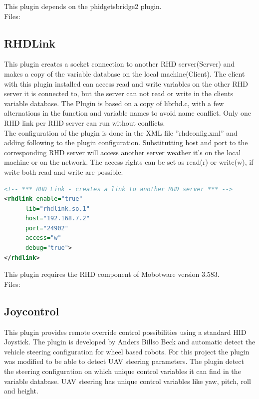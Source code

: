 \noindent
This plugin depends on the phidgetsbridge2 plugin.\\

\noindent
Files:

\subsection{RHDLink}
This plugin creates a socket connection to another RHD server(Server) and makes a copy of the variable database on the local machine(Client). The client with this plugin installed can access read and write variables on the other RHD server it is connected to, but the server can not read or write in the clients variable database. 
The Plugin is based on a copy of librhd.c, with a few alternations in the function and variable names to avoid name conflict. Only one RHD link per RHD server can run without conflicts. \\

\noindent
The configuration of the plugin is done in the XML file ''rhdconfig.xml'' and adding following to the plugin configuration. Substitutting host and port to the corresponding RHD server will access another server weather it's on the local machine or on the network.
The access rights can be set as read(r) or write(w), if write both read and write are possible.
\begin{lstlisting}[language=XML]
<!-- *** RHD Link - creates a link to another RHD server *** -->
<rhdlink enable="true"
	  lib="rhdlink.so.1"
      host="192.168.7.2"
      port="24902"
      access="w"
      debug="true">
</rhdlink>
\end{lstlisting}

\noindent
This plugin requires the RHD component of Mobotware version 3.583.\\

\noindent
Files:


\subsection{Joycontrol}
This plugin provides remote override control possibilities using a standard HID Joystick. The plugin is developed by Anders Billso Beck and automatic detect the vehicle steering configuration for wheel based robots. For this project the plugin was modified to be able to detect UAV steering parameters. The plugin detect the steering configuration on which unique control variables it can find in the variable database. UAV steering has unique control variables like yaw, pitch, roll and height.


